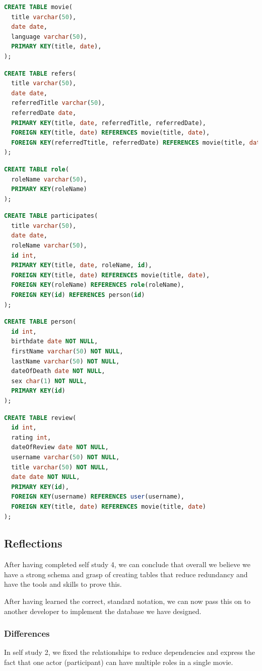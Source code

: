 \begin{lstlisting}[language=SQL]
CREATE TABLE movie(
  title varchar(50),
  date date,
  language varchar(50),
  PRIMARY KEY(title, date),
);
\end{lstlisting}

\begin{lstlisting}[language=SQL]
CREATE TABLE refers(
  title varchar(50),
  date date,
  referredTitle varchar(50),
  referredDate date,
  PRIMARY KEY(title, date, referredTitle, referredDate),
  FOREIGN KEY(title, date) REFERENCES movie(title, date),
  FOREIGN KEY(referredTtitle, referredDate) REFERENCES movie(title, date)
);
\end{lstlisting}

\begin{lstlisting}[language=SQL]
CREATE TABLE role(
  roleName varchar(50),
  PRIMARY KEY(roleName)
);
\end{lstlisting}

\begin{lstlisting}[language=SQL]
CREATE TABLE participates(
  title varchar(50),
  date date,
  roleName varchar(50),
  id int,
  PRIMARY KEY(title, date, roleName, id),
  FOREIGN KEY(title, date) REFERENCES movie(title, date),
  FOREIGN KEY(roleName) REFERENCES role(roleName),
  FOREIGN KEY(id) REFERENCES person(id)
);
\end{lstlisting}

\begin{lstlisting}[language=SQL]
CREATE TABLE person(
  id int,
  birthdate date NOT NULL,
  firstName varchar(50) NOT NULL,
  lastName varchar(50) NOT NULL,
  dateOfDeath date NOT NULL,
  sex char(1) NOT NULL,
  PRIMARY KEY(id)
);
\end{lstlisting}

\begin{lstlisting}[language=SQL]
CREATE TABLE review(
  id int,
  rating int,
  dateOfReview date NOT NULL,
  username varchar(50) NOT NULL,
  title varchar(50) NOT NULL,
  date date NOT NULL,
  PRIMARY KEY(id),
  FOREIGN KEY(username) REFERENCES user(username),
  FOREIGN KEY(title, date) REFERENCES movie(title, date)
);
\end{lstlisting}

\subsection{Reflections}
After having completed self study 4, we can conclude that overall we believe we have a strong schema and grasp of creating tables that reduce redundancy and have the tools and skills to prove this.

After having learned the correct, standard notation, we can now pass this on to another developer to implement the database we have designed.

\subsubsection{Differences}
In self study 2, we fixed the relationships to reduce dependencies and express the fact that one actor (participant) can have multiple roles in a single movie.
